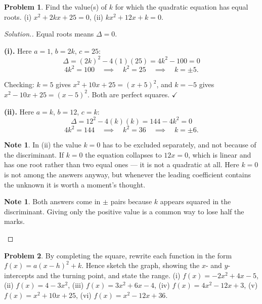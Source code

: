 \documentclass[11pt,a4paper]{article}
\theoremstyle{definition}
\newtheorem{note}[thm]{Note}
\newtheorem{problemx}{Problem}[section]
\newenvironment{problem}{\begin{problemx}}{\end{problemx}}
\newenvironment{solution}
  {\renewcommand{\qedsymbol}{}\begin{proof}[\textit{Solution}.]}
  {\end{proof}}
\let\amscheckmark\checkmark
\renewcommand{\checkmark}{\ensuremath{\amscheckmark}}
\begin{document}
\begin{problem}
Find the value(s) of $k$ for which the quadratic equation has equal roots.
\quad (i) $x^2+2kx+25=0$, \quad (ii) $kx^2+12x+k=0$.
\end{problem}

\begin{solution}
Equal roots means $\Delta=0$.

\textbf{(i).} Here $a=1$, $b=2k$, $c=25$:
$$\Delta=(2k)^2-4(1)(25)=4k^2-100=0$$
$$4k^2=100\quad\implies\quad k^2=25\quad\implies\quad k=\pm 5.$$

Checking: $k=5$ gives $x^2+10x+25=(x+5)^2$, and $k=-5$ gives $x^2-10x+25=(x-5)^2$. Both
are perfect squares. $\checkmark$

\textbf{(ii).} Here $a=k$, $b=12$, $c=k$:
$$\Delta=12^2-4(k)(k)=144-4k^2=0$$
$$4k^2=144\quad\implies\quad k^2=36\quad\implies\quad k=\pm 6.$$

\begin{note}
In (ii) the value $k=0$ has to be excluded separately, and not because of the
discriminant. If $k=0$ the equation collapses to $12x=0$, which is linear and has one
root rather than two equal ones --- it is not a quadratic at all. Here $k=0$ is not
among the answers anyway, but whenever the leading coefficient contains the unknown it
is worth a moment's thought.
\end{note}

\begin{note}
Both answers come in $\pm$ pairs because $k$ appears squared in the discriminant. Giving
only the positive value is a common way to lose half the marks.
\end{note}
\end{solution}

\begin{problem}
By completing the square, rewrite each function in the form $f(x)=a(x-h)^2+k$. Hence
sketch the graph, showing the $x$- and $y$-intercepts and the turning point, and state
the range.
\quad (i) $f(x)=-2x^2+4x-5$, \quad (ii) $f(x)=4-3x^2$, \quad
(iii) $f(x)=3x^2+6x-4$, \quad (iv) $f(x)=4x^2-12x+3$, \quad
(v) $f(x)=x^2+10x+25$, \quad (vi) $f(x)=x^2-12x+36$.
\end{problem}
\end{document}
